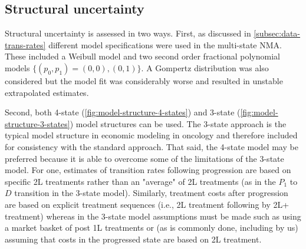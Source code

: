 \documentclass[11pt,final,fleqn]{article}\usepackage[]{graphicx}\usepackage[]{color}
\theoremstyle{plain}
\begin{document}
\subsection{Structural uncertainty}
Structural uncertainty is assessed in two ways. First, as discussed in \autoref{subsec:data-trans-rates} different model specifications were used in the multi-state NMA. These included a Weibull model and two second order fractional polynomial models $\{(p_0, p_1) = (0, 0), (0,1)\}$. A Gompertz distribution was also considered but the model fit was considerably worse and resulted in unstable extrapolated estimates. 

Second, both  4-state (\autoref{fig:model-structure-4-states}) and 3-state (\autoref{fig:model-structure-3-states}) model structures can be used. The 3-state approach is the typical model structure in economic modeling in oncology and therefore included for consistency with the standard approach. That said, the 4-state model may be preferred because it is able to overcome some of the limitations of the 3-state model. For one, estimates of transition rates following progression are based on specific 2L treatments rather than an "average" of 2L treatments (as in the $P_1$ to $D$ transition in the 3-state model). Similarly, treatment costs after progression are based on explicit treatment sequences (i.e., 2L treatment following by 2L+ treatment) whereas in the 3-state model assumptions must be made such as using a market basket of post 1L treatments or (as is commonly done, including by us) assuming that costs in the progressed state are based on 2L treatment.

\FloatBarrier
\end{document}

